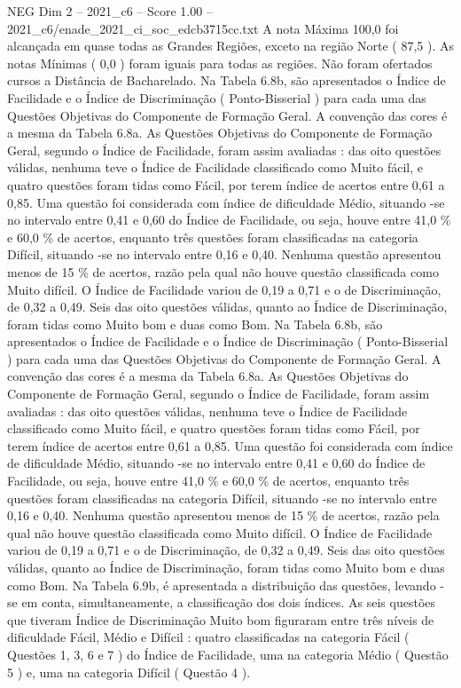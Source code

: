 \begin{textsample}{NEG Dim 2 – 2021\_c6 – Score 1.00 – 2021\_c6/enade\_2021\_ci\_soc\_edcb3715cc.txt}
A nota Máxima 100,0 foi alcançada em quase todas as Grandes Regiões, exceto na região Norte ( 87,5 ).
As notas Mínimas ( 0,0 ) foram iguais para todas as regiões.
Não foram ofertados cursos a Distância de Bacharelado.
Na Tabela 6.8b, são apresentados o Índice de Facilidade e o Índice de Discriminação ( Ponto-Bisserial ) para cada uma das Questões Objetivas do Componente de Formação Geral.
A convenção das cores é a mesma da Tabela 6.8a.
As Questões Objetivas do Componente de Formação Geral, segundo o Índice de Facilidade, foram assim avaliadas : das oito questões válidas, nenhuma teve o Índice de Facilidade classificado como Muito fácil, e quatro questões foram tidas como Fácil, por terem índice de acertos entre 0,61 a 0,85.
Uma questão foi considerada com índice de dificuldade Médio, situando -se no intervalo entre 0,41 e 0,60 do Índice de Facilidade, ou seja, houve entre 41,0 \% e 60,0 \% de acertos, enquanto três questões foram classificadas na categoria Difícil, situando -se no intervalo entre 0,16 e 0,40.
Nenhuma questão apresentou menos de 15 \% de acertos, razão pela qual não houve questão classificada como Muito difícil.
O Índice de Facilidade variou de 0,19 a 0,71 e o de Discriminação, de 0,32 a 0,49.
Seis das oito questões válidas, quanto ao Índice de Discriminação, foram tidas como Muito bom e duas como Bom.
Na Tabela 6.8b, são apresentados o Índice de Facilidade e o Índice de Discriminação ( Ponto-Bisserial ) para cada uma das Questões Objetivas do Componente de Formação Geral.
A convenção das cores é a mesma da Tabela 6.8a.
As Questões Objetivas do Componente de Formação Geral, segundo o Índice de Facilidade, foram assim avaliadas : das oito questões válidas, nenhuma teve o Índice de Facilidade classificado como Muito fácil, e quatro questões foram tidas como Fácil, por terem índice de acertos entre 0,61 a 0,85.
Uma questão foi considerada com índice de dificuldade Médio, situando -se no intervalo entre 0,41 e 0,60 do Índice de Facilidade, ou seja, houve entre 41,0 \% e 60,0 \% de acertos, enquanto três questões foram classificadas na categoria Difícil, situando -se no intervalo entre 0,16 e 0,40.
Nenhuma questão apresentou menos de 15 \% de acertos, razão pela qual não houve questão classificada como Muito difícil.
O Índice de Facilidade variou de 0,19 a 0,71 e o de Discriminação, de 0,32 a 0,49.
Seis das oito questões válidas, quanto ao Índice de Discriminação, foram tidas como Muito bom e duas como Bom.
Na Tabela 6.9b, é apresentada a distribuição das questões, levando -se em conta, simultaneamente, a classificação dos dois índices.
As seis questões que tiveram Índice de Discriminação Muito bom figuraram entre três níveis de dificuldade Fácil, Médio e Difícil : quatro classificadas na categoria Fácil ( Questões 1, 3, 6 e 7 ) do Índice de Facilidade, uma na categoria Médio ( Questão 5 ) e, uma na categoria Difícil ( Questão 4 ).

\end{textsample}
